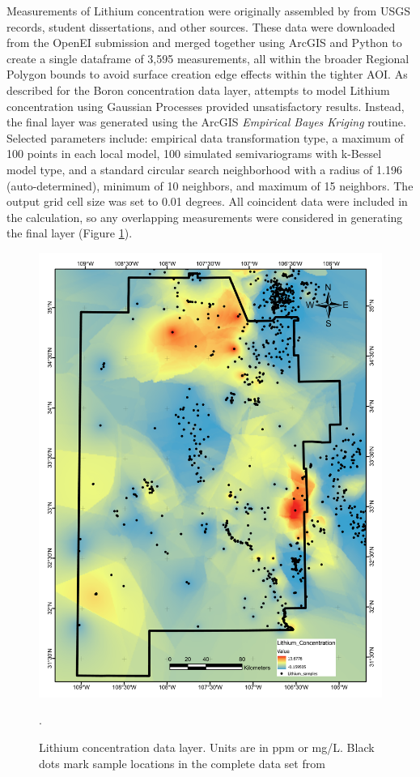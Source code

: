 Measurements of Lithium concentration were originally assembled by \citet{bielicki_hydrogeolgic_2015} from USGS records, student dissertations, and other sources. These data were downloaded from the OpenEI submission \citep{kelley_geothermal_2015} and merged together using ArcGIS and Python to create a single dataframe of 3,595 measurements, all within the broader Regional Polygon bounds to avoid surface creation edge effects within the tighter AOI. As described for the Boron concentration data layer, attempts to model Lithium concentration using Gaussian Processes provided unsatisfactory results. Instead, the final layer was generated using the ArcGIS \textit{Empirical Bayes Kriging} routine. Selected parameters include: empirical data transformation type, a maximum of 100 points in each local model, 100 simulated semivariograms with k-Bessel model type, and a standard circular search neighborhood with a radius of 1.196 (auto-determined), minimum of 10 neighbors, and maximum of 15 neighbors. The output grid cell size was set to 0.01 degrees. All coincident data were included in the calculation, so any overlapping measurements were considered in generating the final layer (Figure \ref{fig:feat_lithium}).

\begin{figure}[!htp]
\centering
\includegraphics[scale=.50]{templates/images/Figure-Lithium.pdf}
\caption[Lithium concentration data layer]{Lithium concentration data layer. Units are in ppm or mg/L. Black dots mark sample locations in the complete data set from \protect\citep{bielicki_hydrogeolgic_2015}}.
\label{fig:feat_lithium}
\end{figure}

